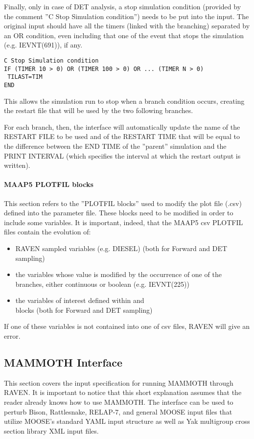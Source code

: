 Finally, only in case of DET analysis, a stop simulation condition (provided by the comment
''C Stop Simulation condition'') needs to be put into the input.
The original input should have all the timers (linked with the branching) separated by an OR
condition, even including that one of the event that stops the simulation (e.g. IEVNT(691)),
if any.
\begin{lstlisting}[style=XML]
C Stop Simulation condition
IF (TIMER 10 > 0) OR (TIMER 100 > 0) OR ... (TIMER N > 0)
 TILAST=TIM
END
\end{lstlisting}
This allows the simulation run to stop when a branch condition occurs, creating the restart file that will
be used by the two following branches.

For each branch, then, the interface will automatically update the name of the RESTART FILE to be used and
of the RESTART TIME that will be equal to the difference between the END TIME of the ''parent'' simulation
and the PRINT INTERVAL (which specifies the interval at which the restart output is written).
\paragraph{MAAP5 PLOTFIL blocks}
This section refers to the ''PLOTFIL blocks'' used to modify the plot file (.csv) defined into the parameter file.
These blocks need to be modified in order to include some variables.
It is important, indeed, that the MAAP5 csv PLOTFIL files contain the evolution of:
\begin{itemize}
  \item RAVEN sampled variables (e.g. DIESEL) (both for Forward and DET sampling)
  \item the variables whose value is modified by the occurrence of one of the branches, either continuous or boolean (e.g. IEVNT(225))
  \item the variables of interest defined within 
  and \\  blocks (both for Forward and DET sampling)
\end{itemize}
If one of these variables is not contained into one of csv files, RAVEN will give an error.

\subsection{MAMMOTH Interface}
%
This section covers the input specification for running MAMMOTH through RAVEN.
It is important to notice that this short explanation assumes that the reader already knows how to use MAMMOTH.
The interface can be used to perturb Bison, Rattlesnake, RELAP-7, and general MOOSE input files that utilize
MOOSE's standard YAML input structure as well as Yak multigroup cross section library XML input files.
%

